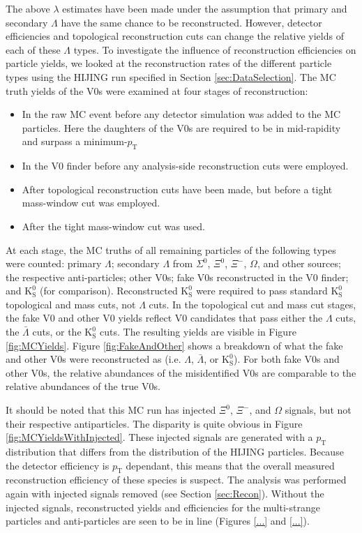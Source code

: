 The above $\lambda$ estimates have been made under the assumption that primary and secondary $\Lambda$ have the same chance to be reconstructed.  However, detector efficiencies and topological reconstruction cuts can change the relative yields of each of these $\Lambda$ types.  To investigate the influence of reconstruction efficiencies on particle yields, we looked at the reconstruction rates of the different particle types using the HIJING run specified in Section \ref{sec:DataSelection}.  The MC truth yields of the V0s were examined at four stages of reconstruction:
\begin{itemize}
\item In the raw MC event before any detector simulation was added to the MC particles.  Here the daughters of the V0s are required to be in mid-rapidity and surpass a minimum-$p_\mathrm{T}$
\item In the V0 finder before any analysis-side reconstruction cuts were employed.
\item After topological reconstruction cuts have been made, but before a tight mass-window cut was employed.
\item After the tight mass-window cut was used.
\end{itemize}
At each stage, the MC truths of all remaining particles of the following types were counted: primary $\Lambda$; secondary $\Lambda$ from $\Sigma^0$, $\Xi^0$, $\Xi^-$, $\Omega$, and other sources; the respective anti-particles; other V0s; fake V0s reconstructed in the V0 finder; and $\mathrm{K}^0_{\mathrm{S}}$ (for comparison).  Reconstructed $\mathrm{K}^0_{\mathrm{S}}$ were required to pass standard $\mathrm{K}^0_{\mathrm{S}}$ topological and mass cuts, not $\Lambda$ cuts.  In the topological cut and mass cut stages, the fake V0 and other V0 yields reflect V0 candidates that pass either the $\Lambda$ cuts, the $\bar{\Lambda}$ cuts, or the $\mathrm{K}^0_{\mathrm{S}}$ cuts.  The resulting yields are visible in Figure \ref{fig:MCYields}.  Figure \ref{fig:FakeAndOther} shows a breakdown of what the fake and other V0s were reconstructed as (i.e. $\Lambda$, $\bar{\Lambda}$, or $\mathrm{K}^0_{\mathrm{S}}$).  For both fake V0s and other V0s, the relative abundances of the misidentified V0s are comparable to the relative abundances of the true V0s.

It should be noted that this MC run has injected $\Xi^0$, $\Xi^-$, and $\Omega$ signals, but not their respective antiparticles.  The disparity is quite obvious in Figure \ref{fig:MCYieldsWithInjected}.  These injected signals are generated with a $p_\mathrm{T}$ distribution that differs from the distribution of the HIJING particles.  Because the detector efficiency is $p_\mathrm{T}$ dependant, this means that the overall measured reconstruction efficiency of these species is suspect.  The analysis was performed again with injected signals removed (see Section \ref{sec:Recon}).  Without the injected signals, reconstructed yields and efficiencies for the multi-strange particles and anti-particles are seen to be in line (Figures \ref{...} and \ref{...}).

